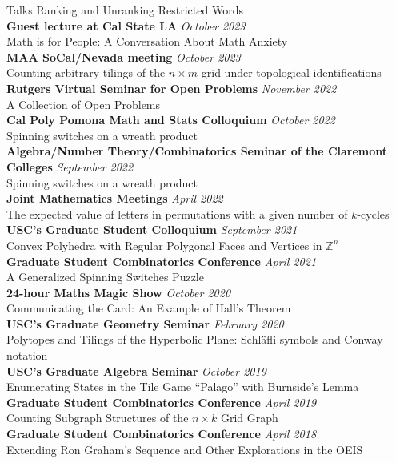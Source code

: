 \documentclass{cv} %
\begin{document}
\begin{rSection}{Talks}
  Ranking and Unranking Restricted Words
  \\
  \textbf{Guest lecture at Cal State LA} \hfill \textit{October 2023}\\
  Math is for People: A Conversation About Math Anxiety
  \\
  \textbf{MAA SoCal/Nevada meeting} \hfill \textit{October 2023} \\
  Counting arbitrary tilings of the $n \times m$ grid under topological identifications
  \\
  \textbf{Rutgers Virtual Seminar for Open Problems} \hfill \textit{November 2022} \\
  A Collection of Open Problems
  \\
  \textbf{Cal Poly Pomona Math and Stats Colloquium} \hfill \textit{October 2022} \\
  Spinning switches on a wreath product
  \\
  \textbf{Algebra/Number Theory/Combinatorics Seminar of the Claremont Colleges} \hfill \textit{September 2022} \\
  Spinning switches on a wreath product
  \\
  \textbf{Joint Mathematics Meetings} \hfill \textit{April 2022} \\
  The expected value of letters in permutations with a given number of $k$-cycles
  \\
  \textbf{USC's Graduate Student Colloquium} \hfill \textit{September 2021} \\
  Convex Polyhedra with Regular Polygonal Faces and Vertices in $\mathbb Z^n$
  \\
  \textbf{Graduate Student Combinatorics Conference} \hfill \textit{April 2021} \\
  A Generalized Spinning Switches Puzzle
  \\
  \textbf{24-hour Maths Magic Show} \hfill \textit{October 2020} \\
  Communicating the Card: An Example of Hall's Theorem
  \\
  \textbf{USC's Graduate Geometry Seminar} \hfill \textit{February 2020} \\
  Polytopes and Tilings of the Hyperbolic Plane: Schl\"afli symbols and Conway notation
  \\
  \textbf{USC's Graduate Algebra Seminar} \hfill \textit{October 2019} \\
  Enumerating States in the Tile Game ``Palago'' with Burnside's Lemma
  \\
  \textbf{Graduate Student Combinatorics Conference} \hfill \textit{April 2019} \\
  Counting Subgraph Structures of the \(n \times k\) Grid Graph
  \\
  \textbf{Graduate Student Combinatorics Conference} \hfill \textit{April 2018} \\
  Extending Ron Graham's Sequence and Other Explorations in the OEIS
\end{rSection}
\end{document}
